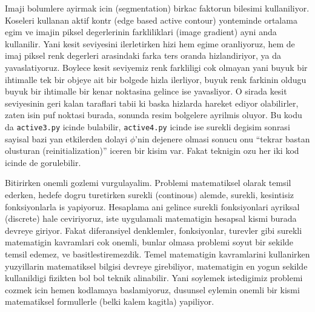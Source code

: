 \documentclass[12pt,fleqn]{article}
\begin{document}
Imaji bolumlere ayirmak icin (segmentation) birkac faktorun bilesimi
kullaniliyor. Koseleri kullanan aktif kontr (edge based active contour)
yonteminde ortalama egim ve imajin piksel degerlerinin farkliliklari (image
gradient) ayni anda kullanilir. Yani kesit seviyesini ilerletirken hizi hem
egime oranliyoruz, hem de imaj piksel renk degerleri arasindaki farka ters
oranda hizlandiriyor, ya da yavaslatiyoruz. Boylece kesit seviyemiz renk
farkliligi cok olmayan yani buyuk bir ihtimalle tek bir objeye ait bir
bolgede hizla ilerliyor, buyuk renk farkinin oldugu buyuk bir ihtimalle bir
kenar noktasina gelince ise yavasliyor. O sirada kesit seviyesinin geri
kalan taraflari tabii ki baska hizlarda hareket ediyor olabilirler, zaten
isin puf noktasi burada, sonunda resim bolgelere ayrilmis oluyor. Bu kodu
da \verb!active3.py! icinde bulabilir, \verb!active4.py! icinde ise surekli
degisim sonrasi sayisal bazi yan etkilerden dolayi $\phi$'nin dejenere
olmasi sonucu onu ``tekrar bastan olusturan (reinitialization)'' iceren bir
kisim var. Fakat teknigin ozu her iki kod icinde de gorulebilir.

Bitirirken onemli gozlemi vurgulayalim. Problemi matematiksel olarak temsil
ederken, hedefe dogru turetirken surekli (continous) alemde, surekli,
kesintisiz fonksiyonlarla is yapiyoruz. Hesaplama ani gelince surekli
fonksiyonlari ayriksal (discrete) hale ceviriyoruz, iste uygulamali
matematigin hesapsal kismi burada devreye giriyor. Fakat diferansiyel
denklemler, fonksiyonlar, turevler gibi surekli matematigin kavramlari cok
onemli, bunlar olmasa problemi soyut bir sekilde temsil edemez, ve
basitlestiremezdik. Temel matematigin kavramlarini kullanirken yuzyillarin
matematiksel bilgisi devreye girebiliyor, matematigin en yogun sekilde
kullanildigi fizikten bol bol teknik alinabilir. Yani soylemek istedigimiz
problemi cozmek icin hemen kodlamaya baslamiyoruz, dusunsel eylemin onemli
bir kismi matematiksel formullerle (belki kalem kagitla) yapiliyor.







\begin{figure}[!hbp]
\caption{}
\end{figure}
\end{document}
